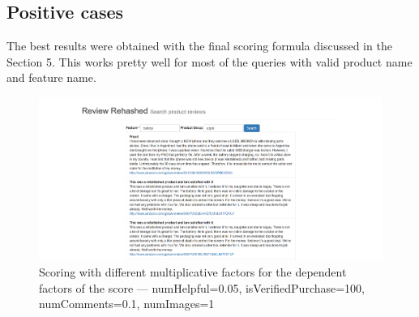 \documentclass{article}
\begin{document}
\subsection{Positive cases}
The best results were obtained with the final scoring formula discussed in the Section 5. This works pretty well for most of the queries with valid product name and feature name.
\begin{figure}[ht!]
  \centering
  \includegraphics[width=1\textwidth]{scoring_piecewise_normalization}
  \caption{Scoring with different multiplicative factors for the dependent factors of the score --- numHelpful=0.05, isVerifiedPurchase=100, numComments=0.1, numImages=1~\label{fig:Search_Engine}}
\end{figure}
\end{document}
